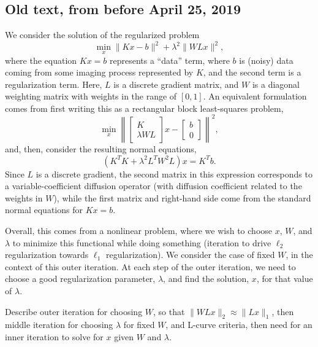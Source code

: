 \subsection{Old text, from before April 25, 2019}
We consider the solution of the regularized problem
\begin{equation}
\label{eq:regularized_old}
\min_{x} \|Kx-b\|^2 + \lambda^2\|WLx\|^2,
\end{equation}
where the equation $Kx=b$ represents a ``data'' term, where $b$ is
(noisy) data coming from some imaging process represented by $K$, and
the second term is a regularization term.  Here, $L$ is a discrete
gradient matrix, and $W$ is a diagonal weighting matrix with weights
in the range of $[0,1]$.  An equivalent formulation comes from first
writing this as a rectangular block least-squares problem,
\begin{equation}
  \label{eq:block-ls-old}
  \min_{x} \left\| \left[\begin{array}{c} K \\ \lambda
                           WL\end{array}\right]x - \left[\begin{array}{c} b \\ 0 \end{array}\right]\right\|^2,
\end{equation}
and, then, consider the resulting normal equations,
\begin{equation}
\label{eq:normal-old}
\left(K^TK + \lambda^2 L^TW^2L\right)x = K^Tb.
\end{equation}
Since $L$ is a discrete gradient, the second matrix in this expression
corresponds to a variable-coefficient diffusion operator (with
diffusion coefficient related to the weights in $W$), while the first
matrix and right-hand side come from the standard normal equations for
$Kx=b$.

Overall, this comes from a nonlinear problem, where we wish to choose
$x$, $W$, and $\lambda$ to minimize this functional while doing
something (iteration to drive $\ell_2$ regularization towards $\ell_1$
regularization).  We consider the case of fixed $W$, in the context of
this outer iteration.  At each step of the outer iteration, we need to
choose a good regularization parameter, $\lambda$, and find the
solution, $x$, for that value of $\lambda$.

Describe outer iteration for choosing $W$, so that $\|WLx\|_2 \approx
\|Lx\|_1$, then middle iteration for choosing $\lambda$ for fixed $W$,
and L-curve criteria, then need for an inner iteration to solve for
$x$ given $W$ and $\lambda$.
